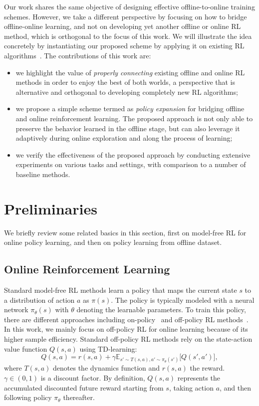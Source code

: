 \documentclass{article}
\begin{document}
Our work shares the same objective of designing effective offline-to-online training schemes.
However, we take a different perspective by focusing on how to bridge offline-online learning, and not on developing yet another offline or online RL method, which is orthogonal to the focus of this work.
We will illustrate the idea concretely by instantiating our proposed scheme by applying it on existing RL algorithms~\citep{iql, sac}.
The contributions of this work are:
\begin{itemize}
	\item we highlight the value of  \emph{properly connecting} existing offline and online RL methods in order to enjoy the best of both worlds, a perspective that is alternative and orthogonal to developing completely new RL algorithms;
    \item we propose a simple scheme termed as \emph{policy expansion}  for bridging offline and online reinforcement learning. The proposed approach is not only able to preserve the behavior  learned in the offline  stage, but can also leverage it adaptively during online exploration and along the process of learning;
    \item we verify the effectiveness of the proposed approach by conducting extensive experiments on various tasks and settings, with comparison to a number of baseline methods.
\end{itemize}




\section{Preliminaries}
We briefly review some related basics in this section,  first  on
model-free RL for online policy learning, and then on policy learning from offline dataset.

\subsection{Online Reinforcement Learning}
Standard model-free RL methods learn a policy
that maps the current state $s$ to a distribution of action $a$ as $\pi(s)$.
The policy is typically modeled with a neural network $\pi_{\theta}(s)$ with $\theta$ denoting the learnable parameters.
To train this policy, there are different approaches including on-policy~\citep{pg, ppo} and off-policy RL methods~\citep{ddpg, sac, TD3, GPM}.
In this work, we mainly focus on off-policy RL for online learning because of its higher sample efficiency.
Standard off-policy RL methods rely on the state-action value function $Q(s, a)$ using TD-learning:
\begin{equation}\label{eq:Q} \nonumber
Q(s, a) =  r(s, a) + \gamma \mathbb{E}_{s' \sim T(s, a), a'\sim\pi_{\theta}(s')} \big [ Q(s', a')\big],
\end{equation}
where $T(s, a)$ denotes the dynamics function and $r(s, a)$ the reward.
$\gamma \in (0, 1)$ is a discount factor.
By definition, $Q(s, a)$ represents the accumulated discounted future reward starting from $s$, taking action $a$, and then following policy $\pi_{\theta}$ thereafter.
\end{document}
